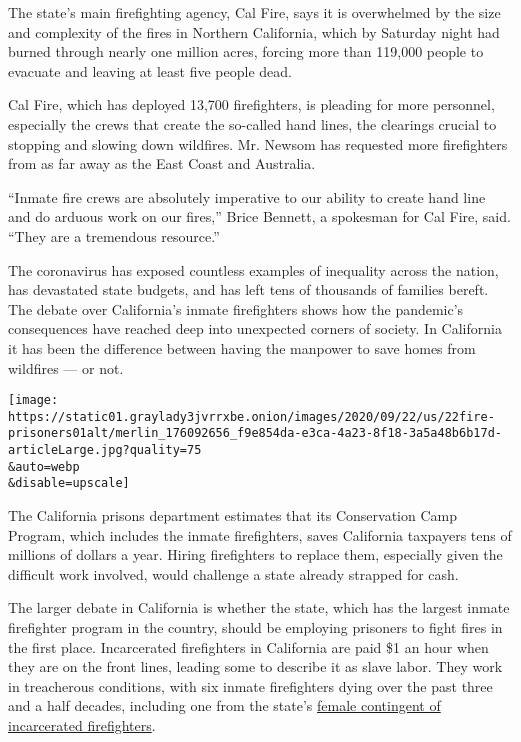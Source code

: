 The state's main firefighting agency, Cal Fire, says it is overwhelmed
by the size and complexity of the fires in Northern California, which by
Saturday night had burned through nearly one million acres, forcing more
than 119,000 people to evacuate and leaving at least five people dead.

Cal Fire, which has deployed 13,700 firefighters, is pleading for more
personnel, especially the crews that create the so-called hand lines,
the clearings crucial to stopping and slowing down wildfires. Mr. Newsom
has requested more firefighters from as far away as the East Coast and
Australia.

``Inmate fire crews are absolutely imperative to our ability to create
hand line and do arduous work on our fires,'' Brice Bennett, a spokesman
for Cal Fire, said. ``They are a tremendous resource.''

The coronavirus has exposed countless examples of inequality across the
nation, has devastated state budgets, and has left tens of thousands of
families bereft. The debate over California's inmate firefighters shows
how the pandemic's consequences have reached deep into unexpected
corners of society. In California it has been the difference between
having the manpower to save homes from wildfires --- or not.

\texttt{[image: https://static01.graylady3jvrrxbe.onion/images/2020/09/22/us/22fire-prisoners01alt/merlin\_176092656\_f9e854da-e3ca-4a23-8f18-3a5a48b6b17d-articleLarge.jpg?quality=75\\\&auto=webp\\\&disable=upscale]}

The California prisons department estimates that its Conservation Camp
Program, which includes the inmate firefighters, saves California
taxpayers tens of millions of dollars a year. Hiring firefighters to
replace them, especially given the difficult work involved, would
challenge a state already strapped for cash.

The larger debate in California is whether the state, which has the
largest inmate firefighter program in the country, should be employing
prisoners to fight fires in the first place. Incarcerated firefighters
in California are paid \$1 an hour when they are on the front lines,
leading some to describe it as slave labor. They work in treacherous
conditions, with six inmate firefighters dying over the past three and a
half decades, including one from the state's
\href{https://www.nytimes3xbfgragh.onion/2017/08/31/magazine/the-incarcerated-women-who-fight-californias-wildfires.html}{female
contingent of incarcerated firefighters}.

